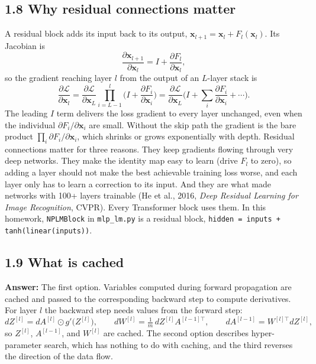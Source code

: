 \documentclass[11pt]{article}
\begin{document}
\subsection*{1.8 Why residual connections matter}
A residual block adds its input back to its output, $\mathbf{x}_{l+1} = \mathbf{x}_l + F_l(\mathbf{x}_l)$. Its Jacobian is
\[
\frac{\partial \mathbf{x}_{l+1}}{\partial \mathbf{x}_l} = I + \frac{\partial F_l}{\partial \mathbf{x}_l},
\]
so the gradient reaching layer $l$ from the output of an $L$-layer stack is
\[
\frac{\partial \mathcal{L}}{\partial \mathbf{x}_l} = \frac{\partial \mathcal{L}}{\partial \mathbf{x}_L}\prod_{i=L-1}^{l}\Big(I + \frac{\partial F_i}{\partial \mathbf{x}_i}\Big)
= \frac{\partial \mathcal{L}}{\partial \mathbf{x}_L}\Big(I + \sum_{i}\frac{\partial F_i}{\partial \mathbf{x}_i} + \cdots\Big).
\]
The leading $I$ term delivers the loss gradient to every layer unchanged, even when the individual $\partial F_i/\partial\mathbf{x}_i$ are small. Without the skip path the gradient is the bare product $\prod_i \partial F_i/\partial \mathbf{x}_i$, which shrinks or grows exponentially with depth. Residual connections matter for three reasons. They keep gradients flowing through very deep networks. They make the identity map easy to learn (drive $F_l$ to zero), so adding a layer should not make the best achievable training loss worse, and each layer only has to learn a correction to its input. And they are what made networks with 100+ layers trainable (He et al., 2016, \emph{Deep Residual Learning for Image Recognition}, CVPR). Every Transformer block uses them. In this homework, \texttt{NPLMBlock} in \texttt{mlp\_lm.py} is a residual block, \texttt{hidden = inputs + tanh(linear(inputs))}.

\subsection*{1.9 What is cached}
\textbf{Answer:} The first option. Variables computed during forward propagation are cached and passed to the corresponding backward step to compute derivatives. For layer $l$ the backward step needs values from the forward step:
\[
d Z^{[l]} = dA^{[l]}\odot g'\big(Z^{[l]}\big), \qquad dW^{[l]} = \tfrac{1}{m}\,dZ^{[l]}A^{[l-1]\top}, \qquad dA^{[l-1]} = W^{[l]\top}dZ^{[l]},
\]
so $Z^{[l]}$, $A^{[l-1]}$, and $W^{[l]}$ are cached. The second option describes hyper-parameter search, which has nothing to do with caching, and the third reverses the direction of the data flow.
\end{document}
